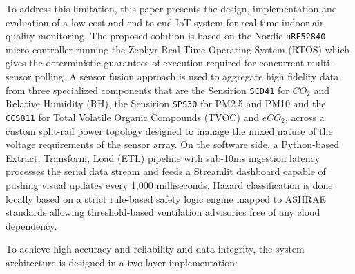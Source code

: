 \documentclass[conference]{IEEEtran}
\begin{document}
To address this limitation, this paper presents the design, implementation and evaluation of a low-cost and end-to-end IoT system for real-time indoor air quality monitoring. The proposed solution is based on the Nordic \texttt{nRF52840} micro-controller running the Zephyr Real-Time Operating System (RTOS) which gives the deterministic guarantees of execution required for concurrent multi-sensor polling. A sensor fusion approach is used to aggregate high fidelity data from three specialized components that are the Sensirion \texttt{SCD41} for $CO_2$ and Relative Humidity (RH), the Sensirion \texttt{SPS30} for PM2.5 and PM10 and the \texttt{CCS811} for Total Volatile Organic Compounds (TVOC) and $eCO_2$, across a custom split-rail power topology designed to manage the mixed nature of the voltage requirements of the sensor array. On the software side, a Python-based Extract, Transform, Load (ETL) pipeline with sub-10ms ingestion latency processes the serial data stream and feeds a Streamlit dashboard capable of pushing visual updates every 1,000 milliseconds. Hazard classification is done locally based on a strict rule-based safety logic engine mapped to ASHRAE standards allowing threshold-based ventilation advisories free of any cloud dependency. 

To achieve high accuracy and reliability and data integrity, the system architecture is designed in a two-layer implementation:
\end{document}

